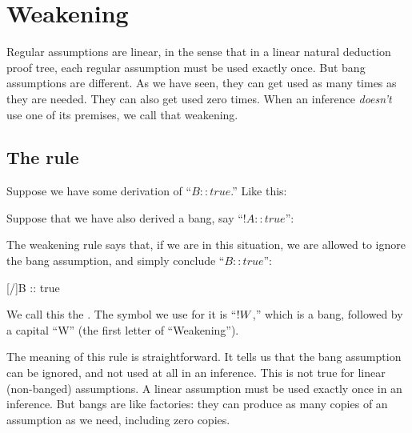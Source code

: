 \documentclass[../../../main.tex]{subfiles}
\begin{document}
\chapter{Weakening}


Regular assumptions are linear, in the sense that in a linear natural deduction proof tree, each regular assumption must be used exactly once. But bang assumptions are different. As we have seen, they can get used as many times as they are needed. They can also get used zero times. When an inference \emph{doesn't} use one of its premises, we call that weakening.


\section{The rule}

Suppose we have some derivation of ``$B :: true$.'' Like this:

\begin{prooftree*}
  \hypo{}
\end{prooftree*}

\noindent
Suppose that we have also derived a bang, say ``$!A :: true$'':

\begin{prooftree*}
  \hypo{}
  \hypo{}
  
\end{prooftree*}

\noindent
The weakening rule says that, if we are in this situation, we are allowed to ignore the bang assumption, and simply conclude ``$B :: true$'':

\begin{prooftree*}
  \hypo{}

  \hypo{}
  
  [\bangWeak/]{B :: true}
\end{prooftree*}

\noindent
We call this the . The symbol we use for it is ``$\bangWeak/$,'' which is a bang, followed by a capital ``W'' (the first letter of ``Weakening''). 

The meaning of this rule is straightforward. It tells us that the bang assumption can be ignored, and not used at all in an inference. This is not true for linear (non-banged) assumptions. A linear assumption must be used exactly once in an inference. But bangs are like factories: they can produce as many copies of an assumption as we need, including zero copies.
\end{document}
